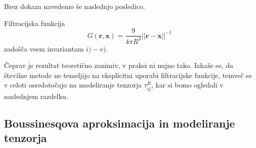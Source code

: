 \documentclass[mat2, tisk]{fmfdelo}
\newcommand{\R}{\mathbb R}
\newcommand{\bd}{\textbf}
\begin{document}
\begin{dokaz}
\end{dokaz}

Brez dokaza navedemo še naslednjo posledico.

\begin{posledica}
Filtracijska funkcija 
$$
G(\bd{r}, \bd{x}) = \frac{9}{4\pi R^3}||\bd{r} - \bd{x}||^{-1}
$$
zadošča vsem invariantam $i) - v)$.
\end{posledica}

Čeprav je rezultat teoretično zanimiv, v praksi ni nujno tako. Izkaže se, da številne
metode ne temeljijo na eksplicitni uporabi filtracijske funkcije, temveč se v celoti osredotočajo
na modeliranje tenzorja $\tau_{ij}^R$, kar si bomo ogledali v naslednjem razdelku. 

\subsection{Boussinesqova aproksimacija in modeliranje tenzorja} %
\end{document}
